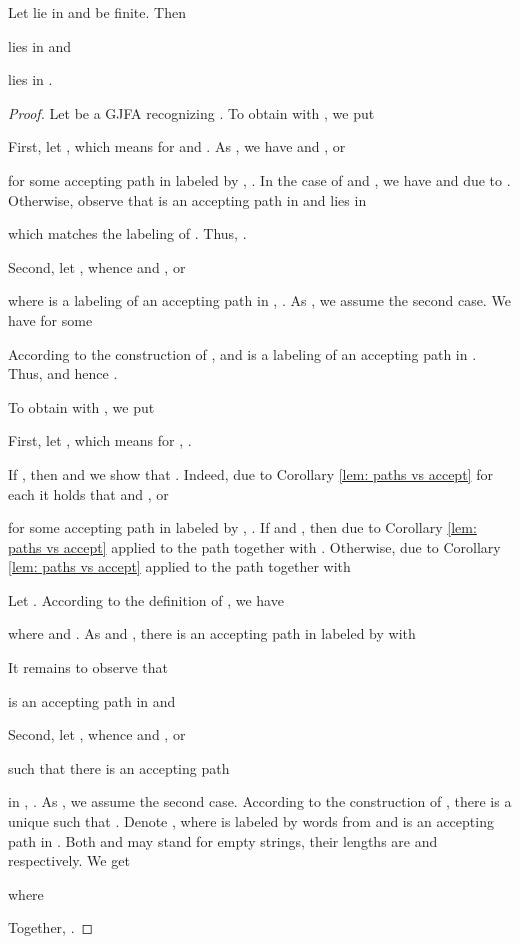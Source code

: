 \documentclass{ws-ijmpc}
\begin{document}
\begin{lemma}
\label{GJFA closed under <- and <-hv}Let 
lie in  and  be finite. Then
\begin{romanlist}
\item  lies in  and
\item  lies in . 
\end{romanlist}
\end{lemma}
\begin{proof}
Let  be a GJFA
recognizing . To obtain  with ,
we put 

First, let , which means 
for  and . As ,
we have  and , or 

for some accepting path  in  labeled by ,
. In the case of  and , we
have  and  due to .
Otherwise, observe that  is
an accepting path in  and  lies in

which matches the labeling of .
Thus, .

Second, let , whence 
and , or 

where  is a labeling of an accepting path
in , . As , we assume the second case.
We have  for some 

According to the construction of ,  and 
is a labeling of an accepting path in . Thus, 
and hence .

To obtain  with ,
we put 

First, let , which means 
for , .
\begin{romanlist}
\item If , then  and we show that .
Indeed, due to Corollary \ref{lem: paths vs accept} for each 
it holds that  and , or 

for some accepting path  in  labeled by ,
. If  and , then 
due to Corollary \ref{lem: paths vs accept} applied to the path 
together with . Otherwise, 
due to Corollary \ref{lem: paths vs accept} applied to the path 
together with


\item Let . According to the definition of , we
have 

where  and . As 
and , there is an accepting path 
in  labeled by  with

It remains to observe that 

is an accepting path in  and 


\end{romanlist}

\noindent Second, let , whence
 and , or 

such that there is an accepting path 

in , . As , we assume the second case.
According to the construction of , there is a unique 
such that .
Denote ,
where  is labeled by words from  and 
is an accepting path in . Both  and 
may stand for empty strings, their lengths are  and  respectively.
We get

where

Together, .

\end{proof}
\end{document}
